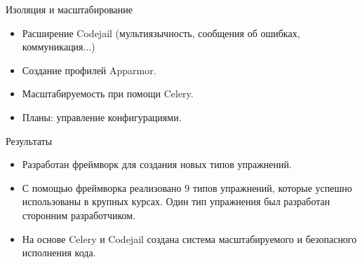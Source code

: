 \documentclass{beamer}
\begin{document}
\begin{frame}{Изоляция и масштабирование}
  \begin{itemize}
  \item Расширение Codejail (мультиязычность, сообщения об ошибках,
    коммуникация...)
  \item Создание профилей Apparmor.
  \item Масштабируемость при помощи Celery.
  \item Планы: управление конфигурациями.
  \end{itemize}
\end{frame}

\begin{frame}{Результаты}
  \begin{itemize}
  \item[\checkmark] Разработан фреймворк для создания новых типов упражнений.
  \item[\checkmark] С помощью фреймворка реализовано 9 типов упражнений, которые успешно использованы
    в крупных курсах. Один тип упражнения был разработан сторонним разработчиком.
  \item[\checkmark] На основе Celery и Codejail создана система масштабируемого и
    безопасного исполнения кода.
  \end{itemize}
\end{frame}
\end{document}
